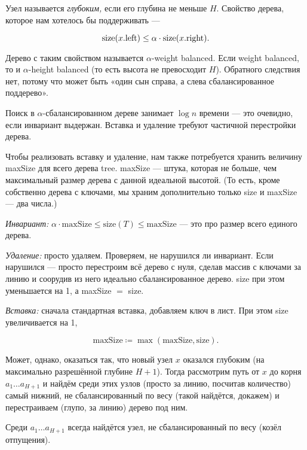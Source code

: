 Узел называется {\it глубоким,} если его глубина не меньше $H$. Свойство дерева, которое нам хотелось бы поддерживать —

\begin{equation*}
	\operatorname{size} (x.\text{left}) \le \alpha \cdot \operatorname{size} (x.\text{right}).
\end{equation*}

Дерево с таким свойством называется $\alpha$-weight balanced. Если weight balanced, то и $\alpha$-height balanced (то есть высота не превосходит $H$). Обратного следствия нет, потому что может быть «один сын справа, а слева сбалансированное поддерево».

Поиск в $\alpha$-сбалансированном дереве занимает $\log n$ времени — это очевидно, если инвариант выдержан. Вставка и удаление требуют частичной перестройки дерева.

Чтобы реализовать вставку и удаление, нам также потребуется хранить величину maxSize для всего дерева tree. maxSize — штука, которая не больше, чем максимальный размер дерева с данной идеальной высотой. (То есть, кроме собственно дерева с ключами, мы храним дополнительно только size и maxSize — два числа.)

{\it Инвариант:} $\alpha \cdot \text{maxSize} \le \text{size} (T) \le \text{maxSize}$ — это про размер всего единого дерева.

{\it Удаление:} просто удаляем. Проверяем, не нарушился ли инвариант. Если нарушился — просто перестроим всё дерево с нуля, сделав массив с ключами за линию и соорудив из него идеально сбалансированное дерево. size при этом уменьшается на 1, а maxSize $=$ size.

{\it Вставка:} сначала стандартная вставка, добавляем ключ в лист. При этом size увеличивается на 1,

\begin{equation*}
	\text{maxSize} \coloneqq \max (\text{maxSize},\text{size}).
\end{equation*}

Может, однако, оказаться так, что новый узел $x$ оказался глубоким (на максимально разрешённой глубине $H+1$). Тогда рассмотрим путь от $x$ до корня $a_1 \ldots a_{H+1}$ и найдём среди этих узлов (просто за линию, посчитав количество) самый нижний, не сбалансированный по весу (такой найдётся, докажем) и перестраиваем (глупо, за линию) дерево под ним.

\begin{theorem}
	Среди $a_1 \ldots a_{H+1}$ всегда найдётся узел, не сбалансированный по весу (козёл отпущения).
\end{theorem}

